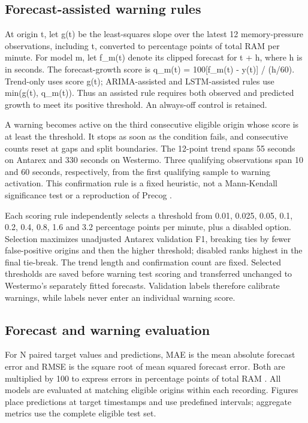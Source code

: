 \documentclass[10pt,a4paper,twocolumn]{article}
\begin{document}
\subsection{Forecast-assisted warning rules}

At origin t, let g(t) be the least-squares slope over the latest 12 memory-pressure observations, including t, converted to percentage points of total RAM per minute. For model m, let f\_m(t) denote its clipped forecast for t + h, where h is in seconds. The forecast-growth score is q\_m(t) = 100[f\_m(t) - y(t)] / (h/60). Trend-only uses score g(t); ARIMA-assisted and LSTM-assisted rules use min(g(t), q\_m(t)). Thus an assisted rule requires both observed and predicted growth to meet its positive threshold. An always-off control is retained.

A warning becomes active on the third consecutive eligible origin whose score is at least the threshold. It stops as soon as the condition fails, and consecutive counts reset at gaps and split boundaries. The 12-point trend spans 55 seconds on Antarex and 330 seconds on Westermo. Three qualifying observations span 10 and 60 seconds, respectively, from the first qualifying sample to warning activation. This confirmation rule is a fixed heuristic, not a Mann-Kendall significance test or a reproduction of Precog \cite{ref1}.

Each scoring rule independently selects a threshold from 0.01, 0.025, 0.05, 0.1, 0.2, 0.4, 0.8, 1.6 and 3.2 percentage points per minute, plus a disabled option. Selection maximizes unadjusted Antarex validation F1, breaking ties by fewer false-positive origins and then the higher threshold; disabled ranks highest in the final tie-break. The trend length and confirmation count are fixed. Selected thresholds are saved before warning test scoring and transferred unchanged to Westermo's separately fitted forecasts. Validation labels therefore calibrate warnings, while labels never enter an individual warning score.

\subsection{Forecast and warning evaluation}

For N paired target values and predictions, MAE is the mean absolute forecast error and RMSE is the square root of mean squared forecast error. Both are multiplied by 100 to express errors in percentage points of total RAM \cite{ref41}. All models are evaluated at matching eligible origins within each recording. Figures place predictions at target timestamps and use predefined intervals; aggregate metrics use the complete eligible test set.
\end{document}
